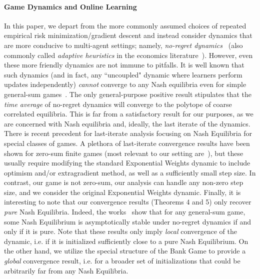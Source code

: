 \paragraph{Game Dynamics and Online Learning} In this paper, we depart from the more commonly assumed choices of repeated empirical risk minimization/gradient descent and instead consider dynamics that are more conducive to multi-agent settings; namely, \emph{no-regret dynamics}~\cite{freund1999adaptive} (also commonly called \emph{adaptive heuristics} in the economics literature~\cite{hart2005adaptive}).
However, even these more friendly dynamics are not immune to pitfalls. It is well known that such dynamics (and in fact, any ``uncoupled" dynamic where learners perform updates independently) \emph{cannot} converge to any Nash equilibria even for simple general-sum games~\cite{hart2003uncoupled}.
The only general-purpose positive result stipulates that the \emph{time average} of no-regret dynamics will converge to the polytope of coarse correlated equilibria. 
This is far from a satisfactory result for our purposes, as we are concerned with Nash equilibria and, ideally, the last iterate of the dynamics.
There is recent precedent for last-iterate analysis focusing on Nash Equilibria for special classes of games.
A plethora of last-iterate convergence results have been shown for zero-sum finite games (most relevant to our setting are~\cite{daskalakis2019last,cai2022finite}), but these usually require modifying the standard Exponential Weights dynamic to include optimism and/or extragradient method, as well as a sufficiently small step size.
In contrast, our game is not zero-sum, our analysis can handle any non-zero step size, and we consider the original Exponential Weights dynamic.
Finally, it is interesting to note that our convergence results (Theorems 4 and 5) only recover \emph{pure} Nash Equilibria.
Indeed, the works~\cite{vlatakis2020no,giannou2021survival} show that for any general-sum game, some Nash Equilibrium is asymptotically stable under no-regret dynamics if and only if it is pure. Note that these results only imply \emph{local} convergence of the dynamic, i.e. if it is initialized sufficiently close to a pure Nash Equilibrium.
On the other hand, we utilize the special structure of the Bank Game to provide a \emph{global} convergence result, i.e. for a broader set of initializations that could be arbitrarily far from any Nash Equilibria.



